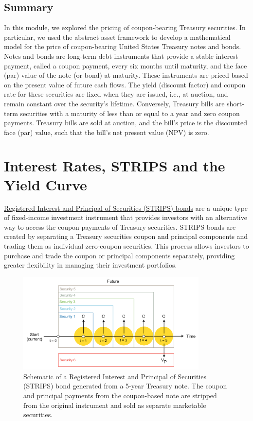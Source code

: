 \documentclass[11pt]{article}
\theoremstyle{definition}
\begin{document}
\subsection{Summary}
In this module, we explored the pricing of coupon-bearing Treasury securities.
In particular, we used the abstract asset framework to develop a mathematical model for the price of coupon-bearing United States Treasury notes and bonds.
Notes and bonds are long-term debt instruments that provide a stable interest payment, called a coupon payment, every six months until maturity, and the face (par) value of the note (or bond) at maturity.
These instruments are priced based on the present value of future cash flows. The yield (discount factor) and coupon rate for these securities are fixed when they are issued, i.e., at auction, and remain constant over the security's lifetime. Conversely, Treasury bills are short-term securities with a maturity of less than or equal to a year and zero coupon payments. Treasury bills are sold at auction, and the bill's price is the discounted face (par) value, such that the bill's net present value (NPV) is zero.

\clearpage

\section{Interest Rates, STRIPS and the Yield Curve}
\href{https://en.wikipedia.org/wiki/United_States_Treasury_security#STRIPS}{Registered Interest and Principal of Securities (STRIPS) bonds} are a unique type of fixed-income investment instrument that provides investors with an alternative way to access the coupon payments of Treasury securities. STRIPS bonds are created by separating a Treasury securities coupon and principal components and trading them as individual 
zero-coupon securities. This process allows investors to purchase and trade the coupon or principal components separately, providing greater flexibility in managing their investment portfolios.

\begin{figure}[h]
    \centering
    \includegraphics[width=0.85\textwidth]{./figs/Fig-STRIPS-Schematic.pdf}
    \caption{Schematic of a Registered Interest and Principal of Securities (STRIPS) bond generated from a 5-year Treasury note. The coupon and principal payments from the coupon-based 
	note are stripped from the original instrument and sold as separate marketable securities.}\label{fig:strips-bond-schematic}
\end{figure}
\end{document}
